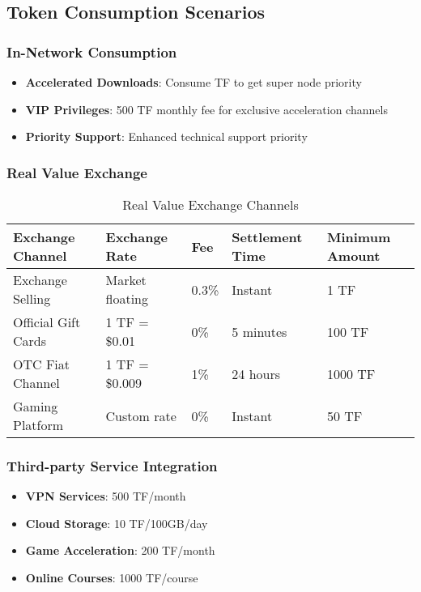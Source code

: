 \documentclass[12pt,a4paper]{article}
\begin{document}
\subsection{Token Consumption Scenarios}

\subsubsection{In-Network Consumption}
\begin{itemize}
    \item \textbf{Accelerated Downloads}: Consume TF to get super node priority
    \item \textbf{VIP Privileges}: 500 TF monthly fee for exclusive acceleration channels
    \item \textbf{Priority Support}: Enhanced technical support priority
\end{itemize}

\subsubsection{Real Value Exchange}

\begin{table}[htbp]
\centering
\begin{tabular}{|l|l|l|l|l|}
\hline
\textbf{Exchange Channel} & \textbf{Exchange Rate} & \textbf{Fee} & \textbf{Settlement Time} & \textbf{Minimum Amount} \\
\hline
Exchange Selling & Market floating & 0.3\% & Instant & 1 TF \\
\hline
Official Gift Cards & 1 TF = \$0.01 & 0\% & 5 minutes & 100 TF \\
\hline
OTC Fiat Channel & 1 TF = \$0.009 & 1\% & 24 hours & 1000 TF \\
\hline
Gaming Platform & Custom rate & 0\% & Instant & 50 TF \\
\hline
\end{tabular}
\caption{Real Value Exchange Channels}
\end{table}

\subsubsection{Third-party Service Integration}
\begin{itemize}
    \item \textbf{VPN Services}: 500 TF/month
    \item \textbf{Cloud Storage}: 10 TF/100GB/day
    \item \textbf{Game Acceleration}: 200 TF/month
    \item \textbf{Online Courses}: 1000 TF/course
\end{itemize}
\end{document}
